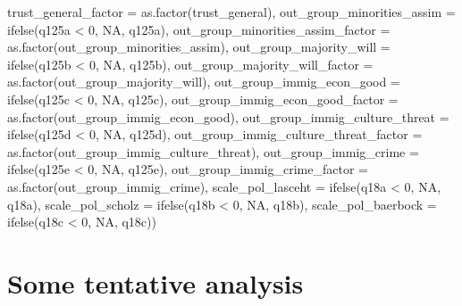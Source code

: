 \documentclass[
]{article}
\newenvironment{Shaded}{\begin{snugshade}}{\end{snugshade}}
\newcommand{\AttributeTok}[1]{\textcolor[rgb]{0.77,0.63,0.00}{#1}}
\newcommand{\ConstantTok}[1]{\textcolor[rgb]{0.00,0.00,0.00}{#1}}
\newcommand{\DecValTok}[1]{\textcolor[rgb]{0.00,0.00,0.81}{#1}}
\newcommand{\FunctionTok}[1]{\textcolor[rgb]{0.00,0.00,0.00}{#1}}
\newcommand{\NormalTok}[1]{#1}
\newcommand{\SpecialCharTok}[1]{\textcolor[rgb]{0.00,0.00,0.00}{#1}}
\begin{document}
\begin{Shaded}
\begin{Highlighting}[]
         \AttributeTok{trust\_general\_factor =} \FunctionTok{as.factor}\NormalTok{(trust\_general),}
         \AttributeTok{out\_group\_minorities\_assim =} \FunctionTok{ifelse}\NormalTok{(q125a }\SpecialCharTok{\textless{}} \DecValTok{0}\NormalTok{, }\ConstantTok{NA}\NormalTok{, q125a),}
         \AttributeTok{out\_group\_minorities\_assim\_factor =} \FunctionTok{as.factor}\NormalTok{(out\_group\_minorities\_assim),}
         \AttributeTok{out\_group\_majority\_will =} \FunctionTok{ifelse}\NormalTok{(q125b }\SpecialCharTok{\textless{}} \DecValTok{0}\NormalTok{, }\ConstantTok{NA}\NormalTok{, q125b),}
         \AttributeTok{out\_group\_majority\_will\_factor =} \FunctionTok{as.factor}\NormalTok{(out\_group\_majority\_will),}
         \AttributeTok{out\_group\_immig\_econ\_good =} \FunctionTok{ifelse}\NormalTok{(q125c }\SpecialCharTok{\textless{}} \DecValTok{0}\NormalTok{, }\ConstantTok{NA}\NormalTok{, q125c),}
         \AttributeTok{out\_group\_immig\_econ\_good\_factor =} \FunctionTok{as.factor}\NormalTok{(out\_group\_immig\_econ\_good),}
         \AttributeTok{out\_group\_immig\_culture\_threat =} \FunctionTok{ifelse}\NormalTok{(q125d }\SpecialCharTok{\textless{}} \DecValTok{0}\NormalTok{, }\ConstantTok{NA}\NormalTok{, q125d),}
         \AttributeTok{out\_group\_immig\_culture\_threat\_factor =} \FunctionTok{as.factor}\NormalTok{(out\_group\_immig\_culture\_threat),}
         \AttributeTok{out\_group\_immig\_crime =} \FunctionTok{ifelse}\NormalTok{(q125e }\SpecialCharTok{\textless{}} \DecValTok{0}\NormalTok{, }\ConstantTok{NA}\NormalTok{, q125e),}
         \AttributeTok{out\_group\_immig\_crime\_factor =} \FunctionTok{as.factor}\NormalTok{(out\_group\_immig\_crime),}
         \AttributeTok{scale\_pol\_lasceht =} \FunctionTok{ifelse}\NormalTok{(q18a }\SpecialCharTok{\textless{}} \DecValTok{0}\NormalTok{, }\ConstantTok{NA}\NormalTok{, q18a),}
         \AttributeTok{scale\_pol\_scholz =} \FunctionTok{ifelse}\NormalTok{(q18b }\SpecialCharTok{\textless{}} \DecValTok{0}\NormalTok{, }\ConstantTok{NA}\NormalTok{, q18b),}
         \AttributeTok{scale\_pol\_baerbock =} \FunctionTok{ifelse}\NormalTok{(q18c }\SpecialCharTok{\textless{}} \DecValTok{0}\NormalTok{, }\ConstantTok{NA}\NormalTok{, q18c))}
\end{Highlighting}
\end{Shaded}

\hypertarget{some-tentative-analysis}{%
\section{Some tentative analysis}\label{some-tentative-analysis}}
\end{document}
